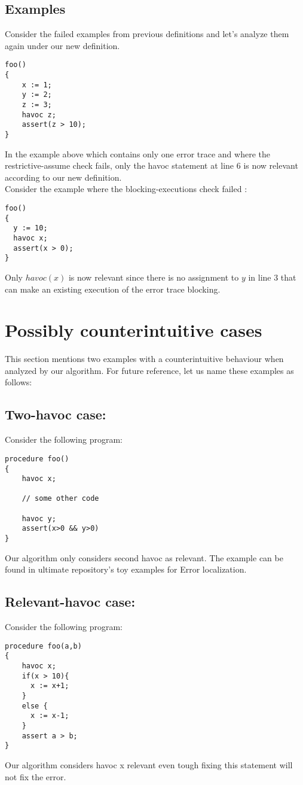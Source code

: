 \documentclass{article}
\begin{document}
\subsection{Examples}
Consider the failed examples from previous definitions and let's analyze them again under our new definition.
\begin{lstlisting}
foo()
{
	x := 1;
	y := 2;
	z := 3;
	havoc z;
	assert(z > 10);
}
\end{lstlisting}
In the example above which contains only one error trace and where the restrictive-assume check fails, only the havoc statement at line 6 is now relevant according to our new definition. \\
Consider the example where the blocking-executions check failed :
\begin{lstlisting}
foo()
{
  y := 10;
  havoc x;
  assert(x > 0);
}
\end{lstlisting}
Only $havoc(x)$ is now relevant since there is no assignment to $y$ in line 3 that can make an existing execution of the error trace blocking.


\section{Possibly counterintuitive cases}
This section mentions two examples with a counterintuitive behaviour when analyzed by our algorithm. For future reference, let us name these examples as follows:
\subsection{Two-havoc case:}
Consider the following program:
\begin{lstlisting}
procedure foo()
{
	havoc x;
	
	// some other code	
	
	havoc y;
	assert(x>0 && y>0)
}
\end{lstlisting}
Our algorithm only considers second havoc as relevant. The example can be found in ultimate repository's toy examples for Error localization.

\subsection{Relevant-havoc case:}
Consider the following program:
\begin{lstlisting}
procedure foo(a,b)
{
    havoc x;
    if(x > 10){
      x := x+1;
    }
    else {
      x := x-1;
    }
    assert a > b;
}
\end{lstlisting}
Our algorithm considers havoc x relevant even tough fixing this statement will not fix the error.
\end{document}

